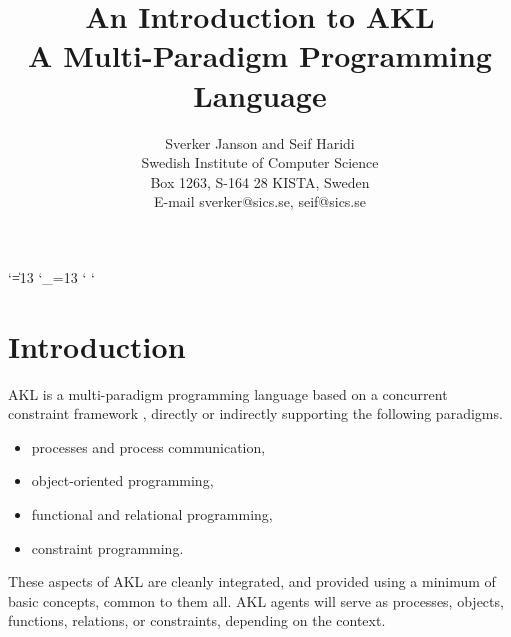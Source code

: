 

\def\progf{}

\begingroup
\catcode`\|=13
\catcode`\_=13
\catcode`
\catcode`

\gdef\prog{\progf%
\catcode`\|=13%
\def|{$\mid$}%
\catcode`\_=13%
\def_{\ifmmode\else\_\fi}%
\catcode`\<=13%
\def<{\ifmmode\char`\<\else$<$\fi}%
\catcode`\>=13%
\def>{\ifmmode\char`\>\else$>$\fi}%
}
\endgroup

\newenvironment{program}{%
\begingroup%
\prog%
\obeylines%
\def\nl{\\[\medskipamount]}%
\begin{tabbing}%
\hskip1cm\=\hskip1cm\=\hskip1cm\=\hskip1cm\=\hskip1cm\=\hskip1cm\=\kill}{%
\end{tabbing}\endgroup\noindent}

\newenvironment{progex}{%
\begingroup%
\prog%
\def\nl{\\[\medskipamount]}%
\begin{tabbing}%
\hskip1cm\hskip1cm\=\+\hskip1cm\=\hskip1cm\=\hskip1cm\=\hskip1cm\=\kill}{%
\end{tabbing}\endgroup\noindent}

\def\cond{$\rightarrow$}

\def\nonterm#1{\langle\mbox{\em #1\/}\rangle}
\def\nt#1{\ifmmode\nonterm{#1}\else$\nonterm{#1}$\fi}


\title{An Introduction to AKL\\
A Multi-Paradigm Programming Language}

\author{Sverker Janson and Seif Haridi\\
Swedish Institute of Computer Science\\ Box 1263, S-164 28 KISTA,
Sweden\\ E-mail sverker@sics.se, seif@sics.se}



\maketitle

\section{Introduction}

AKL is a multi-paradigm programming language based on a concurrent
constraint framework \cite{jaha91}, directly or indirectly supporting
the following paradigms.
%
\begin{itemize}
\item	processes and process communication,
\item	object-oriented programming,
\item	functional and relational programming,
\item	constraint programming.
\end{itemize}
%
These aspects of AKL are cleanly integrated, and provided using a
minimum of basic concepts, common to them all.  AKL agents will serve
as processes, objects, functions, relations, or constraints, depending
on the context.

